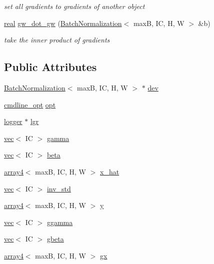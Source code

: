 \begin{DoxyCompactItemize}
\begin{DoxyCompactList}\small\item\em set all gradients to gradients of another object \end{DoxyCompactList}\item 
\hyperlink{vgg__util_8h_a1082d08aaa761215ec83e7149f27ad16}{real} \hyperlink{structBatchNormalization_a377e27f39a4f1e26c952fcf12b362cb3}{gw\+\_\+dot\+\_\+gw} (\hyperlink{structBatchNormalization}{Batch\+Normalization}$<$ maxB, IC, H, W $>$ \&b)
\begin{DoxyCompactList}\small\item\em take the inner product of gradients \end{DoxyCompactList}\end{DoxyCompactItemize}
\subsection*{Public Attributes}
\begin{DoxyCompactItemize}
\item 
\hyperlink{structBatchNormalization}{Batch\+Normalization}$<$ maxB, IC, H, W $>$ $\ast$ \hyperlink{structBatchNormalization_a86d66680b05689ca3df6297e3fd6598e}{dev}
\item 
\hyperlink{structcmdline__opt}{cmdline\+\_\+opt} \hyperlink{structBatchNormalization_a9fb30ad9f94c91d4a4d4ab9d3801cba4}{opt}
\item 
\hyperlink{structlogger}{logger} $\ast$ \hyperlink{structBatchNormalization_a160b18a54054d8afa967acc842dd9cf3}{lgr}
\item 
\hyperlink{structvec}{vec}$<$ IC $>$ \hyperlink{structBatchNormalization_a19341c5df4950a9df17dc3ca2f2b9ecf}{gamma}
\item 
\hyperlink{structvec}{vec}$<$ IC $>$ \hyperlink{structBatchNormalization_a751b4044335ece13ce09f962168e8f1e}{beta}
\item 
\hyperlink{structarray4}{array4}$<$ maxB, IC, H, W $>$ \hyperlink{structBatchNormalization_ab0962f839e8eed605d7fb43fc2eb979d}{x\+\_\+hat}
\item 
\hyperlink{structvec}{vec}$<$ IC $>$ \hyperlink{structBatchNormalization_a32b254c9c4ceb4dc1c952d93851d120f}{inv\+\_\+std}
\item 
\hyperlink{structarray4}{array4}$<$ maxB, IC, H, W $>$ \hyperlink{structBatchNormalization_a1453d9955c9cb72c5316c98cb06d1867}{y}
\item 
\hyperlink{structvec}{vec}$<$ IC $>$ \hyperlink{structBatchNormalization_a050a1a786d6b10b0c0359214cfdb4fef}{ggamma}
\item 
\hyperlink{structvec}{vec}$<$ IC $>$ \hyperlink{structBatchNormalization_a881e8679992c8e0fb22c2e208e55e93d}{gbeta}
\item 
\hyperlink{structarray4}{array4}$<$ maxB, IC, H, W $>$ \hyperlink{structBatchNormalization_a916260aac816d659d876988c94666791}{gx}
\end{DoxyCompactItemize}


